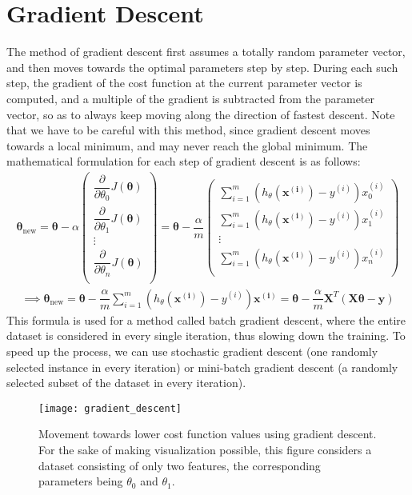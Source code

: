 \documentclass[a4paper, 12pt]{report}
\begin{document}
\section{Gradient Descent}
The method of gradient descent first assumes a totally random parameter vector, and then moves towards the optimal parameters step by step. During each such step, the gradient of the cost function at the current parameter vector is computed, and a multiple of the gradient is subtracted from the parameter vector, so as to always keep moving along the direction of fastest descent. Note that we have to be careful with this method, since gradient descent moves towards a local minimum, and may never reach the global minimum.
The mathematical formulation for each step of gradient descent is as follows:
\begin{align*}
\bm{\theta}_{\text{new}} = \bm{\theta} - \alpha
\begin{pmatrix}
\dfrac{\partial}{\partial \theta_0}J\left(\bm{\theta}\right) \\
\dfrac{\partial}{\partial \theta_1}J\left(\bm{\theta}\right) \\
\vdots \\
\dfrac{\partial}{\partial \theta_n}J\left(\bm{\theta}\right) \\
\end{pmatrix}
= \bm{\theta} - \dfrac{\alpha}{m}
\begin{pmatrix}
\sum_{i=1}^{m}\left(h_{\theta}\left(\bm{x^{\left(i\right)}}\right)-y^{\left(i\right)}\right)x_0^{\left(i\right)} \\
\sum_{i=1}^{m}\left(h_{\theta}\left(\bm{x^{\left(i\right)}}\right)-y^{\left(i\right)}\right)x_1^{\left(i\right)} \\
\vdots \\
\sum_{i=1}^{m}\left(h_{\theta}\left(\bm{x^{\left(i\right)}}\right)-y^{\left(i\right)}\right)x_n^{\left(i\right)} \\
\end{pmatrix}
\end{align*}
\begin{align*}
\implies \bm{\theta}_{\text{new}} = \bm{\theta} - \dfrac{\alpha}{m}\sum_{i=1}^{m}\left(h_{\theta}\left(\bm{x^{\left(i\right)}}\right)-y^{\left(i\right)}\right)\bm{x^{\left(i\right)}} = \bm{\theta} - \dfrac{\alpha}{m}\bm{X}^T\left(\bm{X\theta} - \bm{y}\right)
\end{align*}
This formula is used for a method called batch gradient descent, where the entire dataset is considered in every single iteration, thus slowing down the training. To speed up the process, we can use stochastic gradient descent (one randomly selected instance in every iteration) or mini-batch gradient descent (a randomly selected subset of the dataset in every iteration).
\begin{figure}[H]
\centering
\texttt{[image: gradient\_descent]}
\caption{Movement towards lower cost function values using gradient descent. For the sake of making visualization possible, this figure considers a dataset consisting of only two features, the corresponding parameters being $\theta_0$ and $\theta_1$.}
\end{figure}
\end{document}
